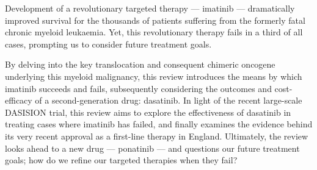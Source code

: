 Development of a revolutionary targeted therapy --- imatinib --- dramatically improved survival for the thousands of patients suffering from the formerly fatal chronic myeloid leukaemia. Yet, this revolutionary therapy fails in a third of all cases, prompting us to consider future treatment goals.

By delving into the key translocation and consequent chimeric oncogene underlying this myeloid malignancy, this review introduces the means by which imatinib succeeds and fails, subsequently considering the outcomes and cost-efficacy of a second-generation drug: dasatinib. In light of the recent large-scale DASISION trial, this review aims to explore the effectiveness of dasatinib in treating cases where imatinib has failed, and finally examines the evidence behind its very recent approval as a first-line therapy in England. Ultimately, the review looks ahead to a new drug --- ponatinib --- and questions our future treatment goals; how do we refine our targeted therapies when they fail?
	
	